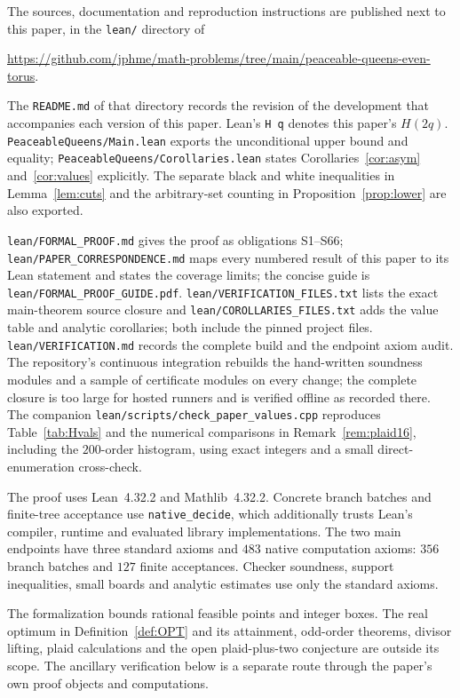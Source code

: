\documentclass[11pt]{amsart}
\theoremstyle{definition}
\theoremstyle{remark}
\begin{document}
The sources, documentation and reproduction instructions are published next
to this paper, in the \texttt{lean/} directory of
\begin{center}
\small\url{https://github.com/jphme/math-problems/tree/main/peaceable-queens-even-torus}.
\end{center}
The \texttt{README.md} of that directory records the revision of the
development that accompanies each version of this paper.
Lean's \texttt{H q} denotes this paper's $H(2q)$.
\texttt{PeaceableQueens/Main.lean} exports the unconditional upper bound
and equality; \texttt{PeaceableQueens/Corollaries.lean} states
Corollaries~\ref{cor:asym} and~\ref{cor:values} explicitly.
The separate black and white inequalities in Lemma~\ref{lem:cuts} and the
arbitrary-set counting in Proposition~\ref{prop:lower} are also exported.

\texttt{lean/FORMAL\_PROOF.md} gives the proof as obligations S1--S66;
\texttt{lean/PAPER\_CORRESPONDENCE.md} maps every numbered result of this
paper to its Lean statement and states the coverage limits; the concise
guide is \texttt{lean/FORMAL\_PROOF\_GUIDE.pdf}.
\texttt{lean/VERIFICATION\_FILES.txt} lists the exact main-theorem source
closure and \texttt{lean/COROLLARIES\_FILES.txt} adds the value table and
analytic corollaries; both include the pinned project files.
\texttt{lean/VERIFICATION.md} records the complete build and the endpoint
axiom audit.  The repository's continuous integration rebuilds the
hand-written soundness modules and a sample of certificate modules on every
change; the complete closure is too large for hosted runners and is verified
offline as recorded there.
The companion \texttt{lean/scripts/check\_paper\_values.cpp} reproduces
Table~\ref{tab:Hvals} and the numerical comparisons in
Remark~\ref{rem:plaid16}, including the $200$-order histogram, using exact
integers and a small direct-enumeration cross-check.

The proof uses Lean~4.32.2 and Mathlib~4.32.2. Concrete branch batches and
finite-tree acceptance use \texttt{native\_decide}, which additionally
trusts Lean's compiler, runtime and evaluated library implementations.
The two main endpoints have three standard axioms and $483$ native
computation axioms: $356$ branch batches and $127$ finite acceptances.
Checker soundness, support inequalities, small boards and analytic estimates
use only the standard axioms.

The formalization bounds rational feasible points and integer boxes.
The real optimum in Definition~\ref{def:OPT} and its attainment, odd-order
theorems, divisor lifting, plaid calculations and the open plaid-plus-two
conjecture are outside its scope. The ancillary verification below is
a separate route through the paper's own proof objects and computations.
\end{document}
